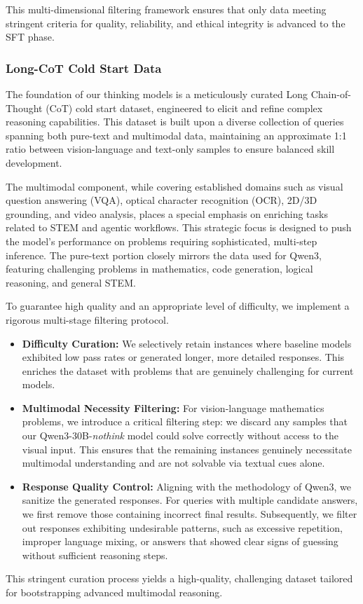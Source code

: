 \documentclass{article} %
\begin{document}
This multi-dimensional filtering framework ensures that only data meeting stringent criteria for quality, reliability, and ethical integrity is advanced to the SFT phase.

\subsubsection{Long-CoT Cold Start Data}

The foundation of our thinking models is a meticulously curated Long Chain-of-Thought (CoT) cold start dataset, engineered to elicit and refine complex reasoning capabilities. This dataset is built upon a diverse collection of queries spanning both pure-text and multimodal data, maintaining an approximate 1:1 ratio between vision-language and text-only samples to ensure balanced skill development.

The multimodal component, while covering established domains such as visual question answering (VQA), optical character recognition (OCR), 2D/3D grounding, and video analysis, places a special emphasis on enriching tasks related to STEM and agentic workflows. This strategic focus is designed to push the model's performance on problems requiring sophisticated, multi-step inference. The pure-text portion closely mirrors the data used for Qwen3, featuring challenging problems in mathematics, code generation, logical reasoning, and general STEM.

To guarantee high quality and an appropriate level of difficulty, we implement a rigorous multi-stage filtering protocol.
\begin{itemize}[itemindent=0pt, labelsep=4pt, leftmargin=*]
\item \textbf{Difficulty Curation:} We selectively retain instances where baseline models exhibited low pass rates or generated longer, more detailed responses. This enriches the dataset with problems that are genuinely challenging for current models.
\item \textbf{Multimodal Necessity Filtering:} For vision-language mathematics problems, we introduce a critical filtering step: we discard any samples that our Qwen3-30B-\textit{nothink} model could solve correctly without access to the visual input. This ensures that the remaining instances genuinely necessitate multimodal understanding and are not solvable via textual cues alone.
\item \textbf{Response Quality Control:} Aligning with the methodology of Qwen3, we sanitize the generated responses. For queries with multiple candidate answers, we first remove those containing incorrect final results. Subsequently, we filter out responses exhibiting undesirable patterns, such as excessive repetition, improper language mixing, or answers that showed clear signs of guessing without sufficient reasoning steps.
\end{itemize}
This stringent curation process yields a high-quality, challenging dataset tailored for bootstrapping advanced multimodal reasoning.
\end{document}
